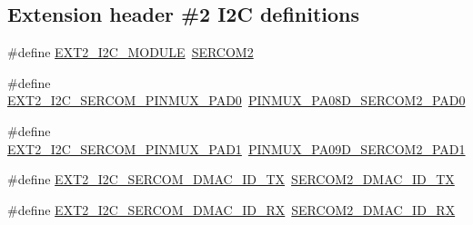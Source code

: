 \subsection*{Extension header \#2 I2C definitions}
\begin{DoxyCompactItemize}
\item 
\#define \mbox{\hyperlink{group__samd21__xplained__pro__features__group_ga087e46c31d1da0eaec55cdb9c5075354}{E\+X\+T2\+\_\+\+I2\+C\+\_\+\+M\+O\+D\+U\+LE}}~\mbox{\hyperlink{group___s_a_m_d21_j18_a__base_ga918e4c85993961a115bb23b4bb73a87f}{S\+E\+R\+C\+O\+M2}}
\item 
\#define \mbox{\hyperlink{group__samd21__xplained__pro__features__group_gae8ffb217b630336bb47b3c5c9d01aa2e}{E\+X\+T2\+\_\+\+I2\+C\+\_\+\+S\+E\+R\+C\+O\+M\+\_\+\+P\+I\+N\+M\+U\+X\+\_\+\+P\+A\+D0}}~\mbox{\hyperlink{pio_2samd21j18a_8h_abe10d951128e796cb99f36d5c5489dda}{P\+I\+N\+M\+U\+X\+\_\+\+P\+A08\+D\+\_\+\+S\+E\+R\+C\+O\+M2\+\_\+\+P\+A\+D0}}
\item 
\#define \mbox{\hyperlink{group__samd21__xplained__pro__features__group_ga2b0d1721964c28bd886ab93b0d774ad2}{E\+X\+T2\+\_\+\+I2\+C\+\_\+\+S\+E\+R\+C\+O\+M\+\_\+\+P\+I\+N\+M\+U\+X\+\_\+\+P\+A\+D1}}~\mbox{\hyperlink{pio_2samd21j18a_8h_adbd76732457e667e3b04123a950bcfc1}{P\+I\+N\+M\+U\+X\+\_\+\+P\+A09\+D\+\_\+\+S\+E\+R\+C\+O\+M2\+\_\+\+P\+A\+D1}}
\item 
\#define \mbox{\hyperlink{group__samd21__xplained__pro__features__group_gaf66e4471b1d6a8bcb6bb13271d265b59}{E\+X\+T2\+\_\+\+I2\+C\+\_\+\+S\+E\+R\+C\+O\+M\+\_\+\+D\+M\+A\+C\+\_\+\+I\+D\+\_\+\+TX}}~\mbox{\hyperlink{sercom2_8h_a18e80edc1d1852734d9542e87c7cc485}{S\+E\+R\+C\+O\+M2\+\_\+\+D\+M\+A\+C\+\_\+\+I\+D\+\_\+\+TX}}
\item 
\#define \mbox{\hyperlink{group__samd21__xplained__pro__features__group_ga69fb9178b70ed36684ae6132b2c95d0a}{E\+X\+T2\+\_\+\+I2\+C\+\_\+\+S\+E\+R\+C\+O\+M\+\_\+\+D\+M\+A\+C\+\_\+\+I\+D\+\_\+\+RX}}~\mbox{\hyperlink{sercom2_8h_adbdd3a084fc9f85a052c316d917e46ac}{S\+E\+R\+C\+O\+M2\+\_\+\+D\+M\+A\+C\+\_\+\+I\+D\+\_\+\+RX}}
\end{DoxyCompactItemize}
